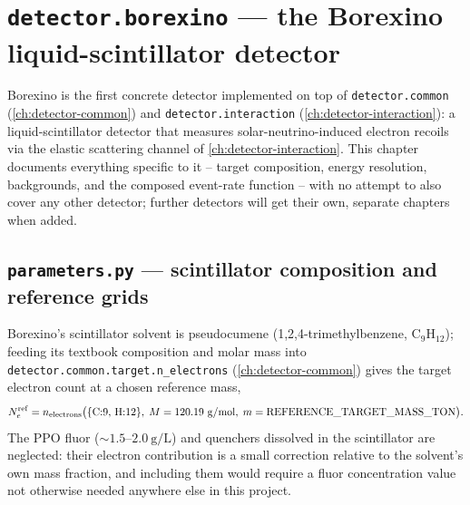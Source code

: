 \chapter{\texttt{detector.borexino} --- the Borexino liquid-scintillator detector}
\label{ch:detector-borexino}

Borexino is the first concrete detector implemented on top of
\texttt{detector.common} (\cref{ch:detector-common}) and
\texttt{detector.interaction} (\cref{ch:detector-interaction}): a
liquid-scintillator detector that measures solar-neutrino-induced electron
recoils via the elastic scattering channel of \cref{ch:detector-interaction}.
This chapter documents everything specific to it -- target composition,
energy resolution, backgrounds, and the composed event-rate function -- with
no attempt to also cover any other detector; further detectors will get
their own, separate chapters when added.

\section{\texttt{parameters.py} --- scintillator composition and reference grids}


\begin{theorybox}
Borexino's scintillator solvent is pseudocumene (1,2,4-trimethylbenzene,
C$_9$H$_{12}$); feeding its textbook composition and molar mass into
\texttt{detector.common.target.n\_electrons} (\cref{ch:detector-common})
gives the target electron count at a chosen reference mass,
\begin{equation}
  N_e^{\rm ref} = n_{\rm electrons}\bigl(\{\text{C}{:}9,\,\text{H}{:}12\},\;
    M=120.19\ \mathrm{g/mol},\; m={\rm REFERENCE\_TARGET\_MASS\_TON}\bigr).
\end{equation}
The PPO fluor ($\sim1.5$--$2.0\ \mathrm{g/L}$) and quenchers dissolved in the
scintillator are neglected: their electron contribution is a small
correction relative to the solvent's own mass fraction, and including them
would require a fluor concentration value not otherwise needed anywhere
else in this project.
\end{theorybox}

